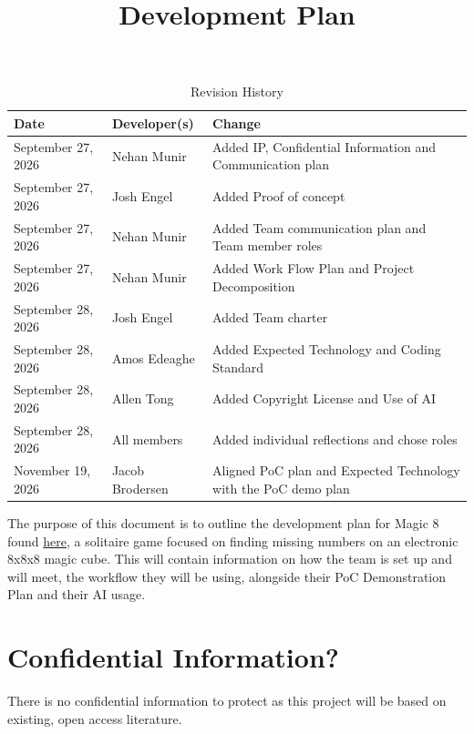 \documentclass{article}
\title{Development Plan\\\progname}
\author{\authname}
\date{}
\begin{document}
\maketitle

\begin{table}[hp]
\caption{Revision History} \label{TblRevisionHistory}
\begin{tabularx}{\textwidth}{llX}
\toprule
\textbf{Date} & \textbf{Developer(s)} & \textbf{Change}\\
\midrule
September 27, 2026 & Nehan Munir & Added IP, Confidential Information and Communication plan \\
September 27, 2026 & Josh Engel & Added Proof of concept\\
September 27, 2026 & Nehan Munir & Added Team communication plan and Team member roles\\
September 27, 2026 & Nehan Munir & Added Work Flow Plan and Project Decomposition\\
September 28, 2026 & Josh Engel & Added Team charter\\
September 28, 2026 & Amos Edeaghe & Added Expected Technology and Coding Standard\\
September 28, 2026 & Allen Tong & Added Copyright License and Use of AI\\
September 28, 2026 & All members & Added individual reflections and chose roles\\
November 19, 2026 & Jacob Brodersen & Aligned PoC plan and Expected Technology with the PoC demo plan\\
\bottomrule
\end{tabularx}
\end{table}

\newpage{}

The purpose of this document is to outline the development plan for Magic 8 found \href{https://github.com/Jacob-MB/magic-8}{here}, a solitaire game focused on finding missing numbers on an electronic 8x8x8 magic cube. This will contain information on how the team is set up and will meet, the workflow they will be using, alongside their PoC Demonstration Plan and their AI usage.


\section{Confidential Information?}

There is no confidential information to protect as this project will be based on existing, open access literature. 
\end{document}
